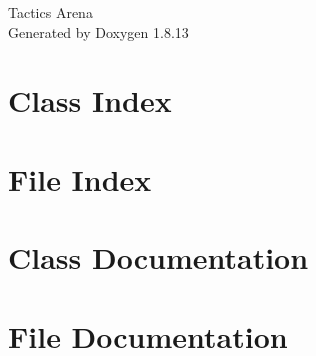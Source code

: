 \documentclass[twoside]{book}
\newcommand{\+}{\discretionary{\mbox{\scriptsize$\hookleftarrow$}}{}{}}
\newcommand{\clearemptydoublepage}{%
  \newpage{\pagestyle{empty}\cleardoublepage}%
}
\begin{document}
\hypersetup{pageanchor=false,
             bookmarksnumbered=true,
             pdfencoding=unicode
            }
\begin{titlepage}
\vspace*{7cm}
\begin{center}%
{\Large Tactics Arena }\\
\vspace*{1cm}
{\large Generated by Doxygen 1.8.13}\\
\end{center}
\end{titlepage}
\clearemptydoublepage
{}
\tableofcontents
\clearemptydoublepage
{}
\hypersetup{pageanchor=true}

\chapter{Class Index}

\chapter{File Index}

\chapter{Class Documentation}




























\chapter{File Documentation}











































\backmatter
\newpage
{}
\clearemptydoublepage
{}
\printindex
\end{document}
